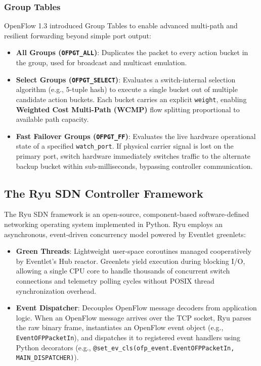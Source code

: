 \subsubsection{Group Tables}
OpenFlow 1.3 introduced Group Tables to enable advanced multi-path and resilient forwarding beyond simple port output:
\begin{itemize}
    \item \textbf{All Groups (\texttt{OFPGT\_ALL})}: Duplicates the packet to every action bucket in the group, used for broadcast and multicast emulation.
    \item \textbf{Select Groups (\texttt{OFPGT\_SELECT})}: Evaluates a switch-internal selection algorithm (e.g., 5-tuple hash) to execute a single bucket out of multiple candidate action buckets. Each bucket carries an explicit \texttt{weight}, enabling \textbf{Weighted Cost Multi-Path (WCMP)} flow splitting proportional to available path capacity.
    \item \textbf{Fast Failover Groups (\texttt{OFPGT\_FF})}: Evaluates the live hardware operational state of a specified \texttt{watch\_port}. If physical carrier signal is lost on the primary port, switch hardware immediately switches traffic to the alternate backup bucket within sub-milliseconds, bypassing controller communication.
\end{itemize}

\subsection{The Ryu SDN Controller Framework}
The Ryu SDN framework \cite{ryucontroller} is an open-source, component-based software-defined networking operating system implemented in Python. Ryu employs an asynchronous, event-driven concurrency model powered by Eventlet greenlets:
\begin{itemize}
    \item \textbf{Green Threads}: Lightweight user-space coroutines managed cooperatively by Eventlet's Hub reactor. Greenlets yield execution during blocking I/O, allowing a single CPU core to handle thousands of concurrent switch connections and telemetry polling cycles without POSIX thread synchronization overhead.
    \item \textbf{Event Dispatcher}: Decouples OpenFlow message decoders from application logic. When an OpenFlow message arrives over the TCP socket, Ryu parses the raw binary frame, instantiates an OpenFlow event object (e.g., \texttt{EventOFPPacketIn}), and dispatches it to registered event handlers using Python decorators (e.g., \texttt{@set\_ev\_cls(ofp\_event.EventOFPPacketIn, MAIN\_DISPATCHER)}).
\end{itemize}

